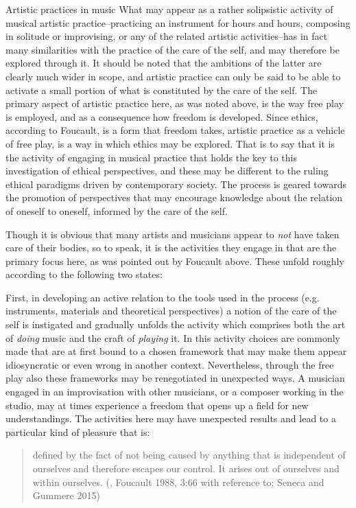 \documentclass[presentation]{beamer}
\makeatletter
\newcommand{\cslcitation}[2]
 {\protect\hyper@linkstart{cite}{citeproc_bib_item_#1}#2\hyper@linkend}
\makeatother
\begin{document}
\begin{frame}[label={sec:org952e88c}]{Artistic practices in music}
What may appear as a rather solipsistic activity of musical artistic practice--practicing an instrument for hours and hours, composing in solitude or improvising, or any of the related artistic activities--has in fact many similarities with the practice of the care of the self, and may therefore be explored through it. It should be noted that the ambitions of the latter are clearly much wider in scope, and artistic practice can only be said to be able to activate a small portion of what is constituted by the care of the self. The primary aspect of artistic practice here, as was noted above, is the way free play is employed, and as a consequence how freedom is developed.
Since ethics, according to Foucault, is a form that freedom takes, artistic practice as a vehicle of free play, is a way in which ethics may be explored. That is to say that it is the activity of engaging in musical practice that holds the key to this investigation of ethical perspectives, and these may be different to the ruling ethical paradigms driven by contemporary society. The process is geared towards the promotion of perspectives that may encourage knowledge about the relation of oneself to oneself, informed by the care of the self.

Though it is obvious that many artists and musicians appear to \emph{not} have taken care of their bodies, so to speak, it is the activities they engage in that are the primary focus here, as was pointed out by Foucault above. These unfold roughly according to the following two states:

First, in developing an active relation to the tools used in the process (e.g. instruments, materials and theoretical perspectives) a notion of the care of the self is instigated and gradually unfolds the activity which comprises both the art of \emph{doing} music and the craft of \emph{playing} it. In this activity choices are commonly made that are at first bound to a chosen framework that may make them appear idiosyncratic or even wrong in another context. Nevertheless, through the free play also these frameworks may be renegotiated in unexpected ways. A musician engaged in an improvisation with other musicians, or a composer working in the studio, may at times experience a freedom that opens up a field for new understandings. The activities here may have unexpected results and lead to a particular kind of pleasure that is:
\begin{quote}
defined by the fact of not being caused by anything that is independent of ourselves and therefore escapes our control. It arises out of ourselves and within ourselves. (, \cslcitation{7}{Foucault 1988, 3:66} with reference to; \cslcitation{18}{Seneca and Gummere 2015})
\end{quote}


\end{frame}
\end{document}
